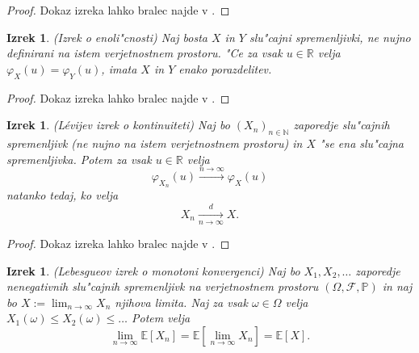 \documentclass[12pt, a4paper, reqno]{amsart}
\theoremstyle{definition}
\theoremstyle{plain}
\newtheorem{izrek}[definicija]{Izrek}
\newcommand{\R}{\mathbb{R}}
\newcommand{\N}{\mathbb{N}}
\newcommand{\E}{\mathbb{E}}
\newcommand{\Prob}{\mathbb{P}}
\newcommand{\1}{\mathds{1}}
\begin{document}
    \begin{proof}
        Dokaz izreka lahko bralec najde v \cite{7}.
    \end{proof}

    \begin{izrek}(Izrek o enoli"cnosti)
        Naj bosta $X$ in $Y$ slu"cajni spremenljivki, ne nujno definirani na istem verjetnostnem prostoru.
        "Ce za vsak $u\in\R$ velja $\varphi_X(u) = \varphi_Y(u)$, imata $X$ in $Y$ enako porazdelitev.
        \label{izr:enolicnost}
    \end{izrek}

    \begin{proof}
        Dokaz izreka lahko bralec najde v \cite{7}.
    \end{proof}

    \begin{izrek}(Lévijev izrek o kontinuiteti)
        Naj bo $(X_n)_{n\in\N}$ zaporedje slu"cajnih spremenljivk (ne nujno na istem verjetnostnem prostoru)
        in $X$ "se ena slu"cajna spremenljivka. Potem za vsak $u\in\R$ velja
        \begin{equation*}
            \varphi_{X_n}(u) \xrightarrow{n\to\infty} \varphi_X(u) 
        \end{equation*}
        natanko tedaj, ko velja
        \begin{equation*}
            X_n \xrightarrow[n\to\infty]{d} X.
        \end{equation*}
        \label{izr:LevijevIzrek}
    \end{izrek}

    \begin{proof}
        Dokaz izreka lahko bralec najde v \cite{7}.
    \end{proof}

    \begin{izrek}(Lebesgueov izrek o monotoni konvergenci)
        Naj bo $X_1, X_2, \dots $ zaporedje nenegativnih slu"cajnih spremenljivk na 
        verjetnostnem prostoru $(\Omega, \mathcal{F}, \Prob)$ in naj bo $X:= \lim_{n\to\infty}X_n$ 
        njihova limita. Naj za vsak $\omega \in \Omega$
        velja $X_1(\omega) \leq X_2(\omega) \leq \dots$ Potem velja 
        \begin{equation*}
            \lim_{n\to\infty}\E\left[X_n\right] = \E\left[\lim_{n\to\infty}X_n\right] = \E\left[X\right].
        \end{equation*}
        \label{izr:monotonaKonvergenca}
    \end{izrek}
\end{document}
